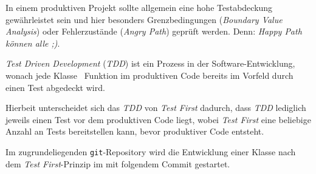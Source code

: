 In einem produktiven Projekt sollte allgemein eine hohe Testabdeckung gewährleistet sein und hier besonders Grenzbedingungen (\textit{Boundary Value Analysis}) oder Fehlerzustände (\textit{Angry Path}) geprüft werden. Denn: \textit{Happy Path können alle ;)}.



\textit{Test Driven Development} (\textit{TDD}) ist ein Prozess in der Software-Entwicklung, wonach jede Klasse \bzw\ Funktion im produktiven Code bereits im Vorfeld durch einen Test abgedeckt wird.

Hierbeit unterscheidet sich das \textit{TDD} von \textit{Test First} dadurch, dass \textit{TDD} lediglich jeweils einen Test vor dem produktiven Code liegt, wobei \textit{Test First} eine beliebige Anzahl an Tests bereitstellen kann, bevor produktiver Code entsteht.

Im zugrundeliegenden \texttt{git}-Repository wird die Entwicklung einer Klasse nach dem \textit{Test First}-Prinzip im  mit folgendem Commit gestartet.


